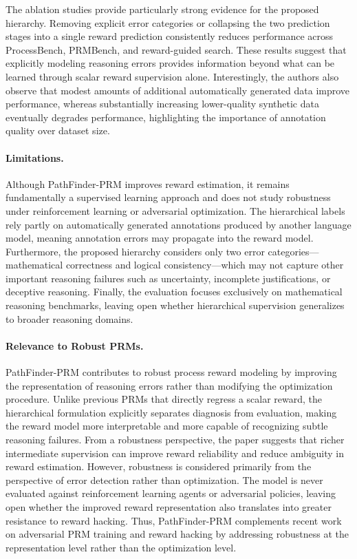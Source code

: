 \documentclass[11pt]{article}
\begin{document}
The ablation studies provide particularly strong evidence for the proposed hierarchy. Removing explicit error categories or collapsing the two prediction stages into a single reward prediction consistently reduces performance across ProcessBench, PRMBench, and reward-guided search. These results suggest that explicitly modeling reasoning errors provides information beyond what can be learned through scalar reward supervision alone. Interestingly, the authors also observe that modest amounts of additional automatically generated data improve performance, whereas substantially increasing lower-quality synthetic data eventually degrades performance, highlighting the importance of annotation quality over dataset size.

\paragraph{Limitations.}
Although PathFinder-PRM improves reward estimation, it remains fundamentally a supervised learning approach and does not study robustness under reinforcement learning or adversarial optimization. The hierarchical labels rely partly on automatically generated annotations produced by another language model, meaning annotation errors may propagate into the reward model. Furthermore, the proposed hierarchy considers only two error categories—mathematical correctness and logical consistency—which may not capture other important reasoning failures such as uncertainty, incomplete justifications, or deceptive reasoning. Finally, the evaluation focuses exclusively on mathematical reasoning benchmarks, leaving open whether hierarchical supervision generalizes to broader reasoning domains. 

\paragraph{Relevance to Robust PRMs.}
PathFinder-PRM contributes to robust process reward modeling by improving the representation of reasoning errors rather than modifying the optimization procedure. Unlike previous PRMs that directly regress a scalar reward, the hierarchical formulation explicitly separates diagnosis from evaluation, making the reward model more interpretable and more capable of recognizing subtle reasoning failures. From a robustness perspective, the paper suggests that richer intermediate supervision can improve reward reliability and reduce ambiguity in reward estimation. However, robustness is considered primarily from the perspective of error detection rather than optimization. The model is never evaluated against reinforcement learning agents or adversarial policies, leaving open whether the improved reward representation also translates into greater resistance to reward hacking. Thus, PathFinder-PRM complements recent work on adversarial PRM training and reward hacking by addressing robustness at the representation level rather than the optimization level.
\end{document}
